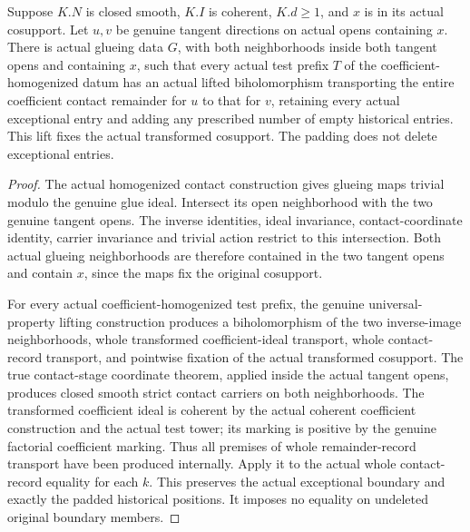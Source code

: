 \begin{theorem}
\label{hir:zero-contact-remainder-actual-contact-lifts}
\leanok
{}
Suppose $K.N$ is closed smooth, $K.I$ is coherent, $K.d\geq1$, and
$x$ is in its actual cosupport. Let $u,v$ be genuine tangent directions
on actual opens containing $x$. There is actual glueing data $G$, with
both neighborhoods inside both tangent opens and containing $x$, such
that every actual test prefix $T$ of the coefficient-homogenized datum
has an actual lifted biholomorphism transporting the entire coefficient
contact remainder for $u$ to that for $v$, retaining every actual
exceptional entry and adding any prescribed number of empty historical
entries. This lift fixes the actual transformed cosupport. The padding
does not delete exceptional entries.
\end{theorem}
\begin{proof}
The actual homogenized contact construction gives glueing maps trivial
modulo the genuine glue ideal. Intersect its open neighborhood with the
two genuine tangent opens. The inverse identities, ideal invariance,
contact-coordinate identity, carrier invariance and trivial action
restrict to this intersection. Both actual glueing neighborhoods are
therefore contained in the two tangent opens and contain $x$, since the
maps fix the original cosupport.

For every actual coefficient-homogenized test prefix, the genuine
universal-property lifting construction produces a biholomorphism of
the two inverse-image neighborhoods, whole transformed coefficient-ideal
transport, whole contact-record transport, and pointwise fixation of
the actual transformed cosupport. The true contact-stage coordinate
theorem, applied inside the actual tangent opens, produces closed smooth
strict contact carriers on both neighborhoods. The transformed coefficient
ideal is coherent by the actual coherent coefficient construction and
the actual test tower; its marking is positive by the genuine factorial
coefficient marking. Thus all premises of whole remainder-record
transport have been produced internally. Apply it to the actual whole
contact-record equality for each $k$. This preserves the actual
exceptional boundary and exactly the padded historical positions.
It imposes no equality on undeleted original boundary members.
\end{proof}

